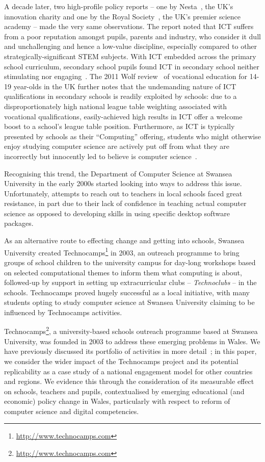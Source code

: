 A decade later, two high-profile policy reports -- one by
Nesta~\cite{nextgen-report}, the UK's innovation charity and one by
the Royal Society~\cite{RoyalSoc:2012}, the UK's premier science
academy -- made the very same observations.  The report noted that ICT
suffers from a poor reputation amongst pupils, parents and industry,
who consider it dull and unchallenging and hence a low-value
discipline, especially compared to other strategically-significant
STEM subjects. With ICT embedded across the primary school curriculum,
secondary school pupils found ICT in secondary school neither
stimulating nor engaging~\cite{sentance-et-al-wipsce2012}. The 2011
Wolf review~\cite{Wolf:2011} of vocational education for 14-19
year-olds in the UK further notes that the undemanding nature of ICT
qualifications in secondary schools is readily exploited by schools:
due to a disproportionately high national league table weighting
associated with vocational qualifications, easily-achieved high
results in ICT offer a welcome boost to a school's league table
position. Furthermore, as ICT is typically presented by schools as
their ``Computing'' offering, students who might otherwise enjoy
studying computer science are actively put off from what they are
incorrectly but innocently led to believe is computer
science~\cite{crick+sentance:2011,brown-et-al-sigcse2012}.

Recognising this trend, the Department of Computer Science at Swansea
University in the early 2000s started looking into ways to address
this issue.  Unfortunately, attempts to reach out to teachers in local
schools faced great resistance, in part due to their lack of
confidence in teaching actual computer science as opposed to
developing skills in using specific desktop software packages.

As an alternative route to effecting change and getting into schools,
Swansea University created
Technocamps\footnote{\url{http://www.technocamps.com}} in 2003, an
outreach programme to bring groups of school children to the
university campus for day-long workshops based on selected
computational themes to inform them what computing is about,
followed-up by support in setting up extracurricular clubs --
\emph{Technoclubs} -- in the schools.  Technocamps proved hugely
successful as a local initiative, with many students opting to study
computer science at Swansea University claiming to be influenced by
Technocamps activities.

Technocamps\footnote{\url{http://www.technocamps.com}}, a
university-based schools outreach programme based at Swansea
University, was founded in 2003 to address these emerging problems in
Wales. We have previously discussed its portfolio of activities in
more detail~\cite{crick+moller-wipsce2015}; in this paper, we consider
the wider impact of the Technocamps project and its potential
replicability as a case study of a national engagement model for other
countries and regions. We evidence this through the consideration of
its measurable effect on schools, teachers and pupils, contextualised
by emerging educational (and economic) policy change in Wales,
particularly with respect to reform of computer science and digital
competencies.

